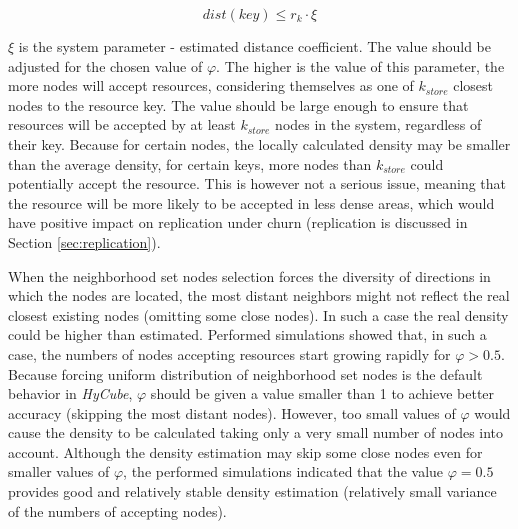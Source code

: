 \begin{equation}
dist(key) \leq r_k \cdot \xi
\end{equation}

\noindent
$\xi$ is the system parameter - estimated distance coefficient. The value should be adjusted for the chosen value of $\varphi$. The higher is the value of this parameter, the more nodes will accept resources, considering themselves as one of $k_{store}$ closest nodes to the resource key. The value should be large enough to ensure that resources will be accepted by at least $k_{store}$ nodes in the system, regardless of their key. Because for certain nodes, the locally calculated density may be smaller than the average density, for certain keys, more nodes than $k_{store}$ could potentially accept the resource. This is however not a serious issue, meaning that the resource will be more likely to be accepted in less dense areas, which would have positive impact on replication under churn (replication is discussed in Section \ref{sec:replication}).

When the neighborhood set nodes selection forces the diversity of directions in which the nodes are located, the most distant neighbors might not reflect the real closest existing nodes (omitting some close nodes). In such a case the real density could be higher than estimated. Performed simulations showed that, in such a case, the numbers of nodes accepting resources start growing rapidly for $\varphi > 0.5$. Because forcing uniform distribution of neighborhood set nodes is the default behavior in \emph{HyCube}, $\varphi$ should be given a value smaller than 1 to achieve better accuracy (skipping the most distant nodes). However, too small values of $\varphi$ would cause the density to be calculated taking only a very small number of nodes into account. Although the density estimation may skip some close nodes even for smaller values of $\varphi$, the performed simulations indicated that the value $\varphi=0.5$ provides good and relatively stable density estimation (relatively small variance of the numbers of accepting nodes).

